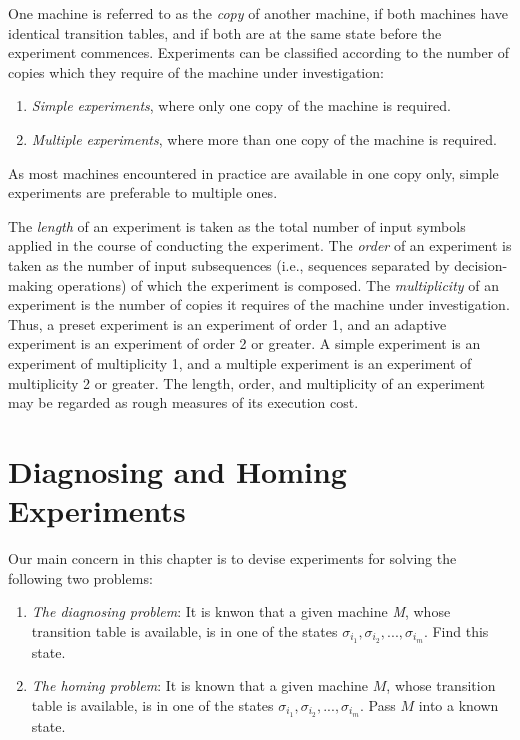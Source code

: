     One machine is referred to as the \emph{copy} of another machine, if both machines have identical transition tables, and if both are at the same state before the experiment commences. Experiments can be classified according to the number of copies which they require of the machine under investigation:

\begin{enumerate}
    \item \emph{Simple experiments}, where only one copy of the machine is required.
    \item \emph{Multiple experiments}, where more than one copy of the machine is required.
\end{enumerate}

    As most machines encountered in practice are available in one copy only, simple experiments are preferable to multiple ones.

    The \emph{length} of an experiment is taken as the total number of input symbols applied in the course of conducting the experiment. The \emph{order} of an experiment is taken as the number of input subsequences (i.e., sequences separated by decision-making operations) of which the experiment is composed. The \emph{multiplicity} of an experiment is the number of copies it requires of the machine under investigation. Thus, a preset experiment is an experiment of order 1, and an adaptive experiment is an experiment of order 2 or greater. A simple experiment is an experiment of multiplicity 1, and a multiple experiment is an experiment of multiplicity 2 or greater. The length, order, and multiplicity of an experiment may be regarded as rough measures of its execution cost.

\section{Diagnosing and Homing Experiments}

    Our main concern in this chapter is to devise experiments for solving the following two problems:
\begin{enumerate}
    \item \emph{The diagnosing problem}: It is knwon that a given machine \emph{M}, whose transition table is available, is in one of the states $ \sigma_{i_{1}}, \sigma_{i_{2}}, ..., \sigma_{i_{m}}  $. Find this state.

    \item \emph{The homing problem}: It is known that a given machine $M$, whose transition table is available, is in one of the states $\sigma_{i_{1}}, \sigma_{i_{2}}, ..., \sigma_{i_{m}}$. Pass $M$ into a known state.
\end{enumerate}



